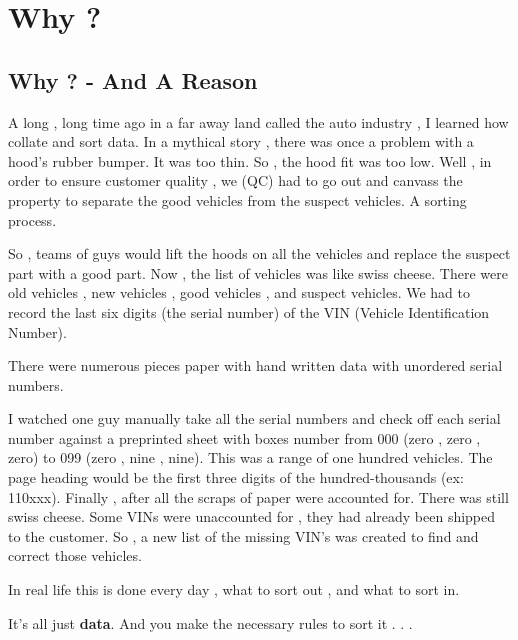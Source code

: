\documentclass[12pt,letterpaper,oneside,titlepage]{article}
\begin{document}
\pagebreak
\section{Why ?}
\subsection{Why ?  - And A Reason}
\par
\tab A long , long time ago in a far away land called the auto industry , I learned how 
collate and sort data. In a mythical story , there was once a problem with a
hood's rubber bumper. It was too thin. So , the hood fit was too low. Well , 
in order to ensure customer quality , we (QC) had to go out and canvass the
property to separate the good vehicles from the suspect vehicles. A sorting
process.
\\ 
\par
So , teams of guys would lift the hoods on all the vehicles and
replace the suspect part with a good part. Now , the list of vehicles was
like swiss cheese. There were old vehicles , new vehicles , good vehicles ,
and suspect vehicles. We had to record the last six digits
(the serial number) of the VIN (Vehicle Identification Number).
\\ 
\par
 There were numerous pieces paper with hand written data with unordered
serial numbers.
\\ 
\par
I watched one guy manually take all the serial numbers and check off each
serial number against a preprinted sheet with boxes number from 000
(zero , zero , zero) to 099 (zero , nine , nine). This was a range of one
hundred vehicles. The page heading would be the first three digits of the
hundred-thousands (ex: 110xxx). Finally , after all the scraps of paper were
accounted for. There was still swiss cheese. Some VINs were unaccounted for , they 
had already been shipped to the customer. So , a new list of the
missing VIN's was created to find and correct those vehicles.
\\
\par
 In real life this is done every day , what to sort out , and what to sort in.
\\
\par
 It's all just \textbf{data}. And you make the necessary rules to sort it . . .
\\
\end{document}
